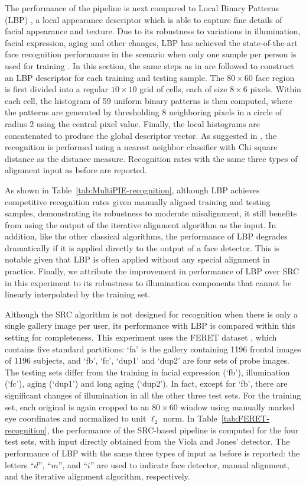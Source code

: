 The performance of the pipeline is next compared to Local Binary Patterns (LBP)
\cite{Ahonen2006-PAMI}, a local appearance descriptor which is able to capture
fine details of facial appearance and texture.  Due to its robustness to
variations in illumination, facial expression, aging and other changes, LBP has
achieved the state-of-the-art face recognition performance in the scenario when
only one sample per person is used for training \cite{Tan06facerecognition}. In
this section, the same steps as in \cite{Ahonen2006-PAMI} are followed to
construct an LBP descriptor for each training and testing sample. The $80\times
60$ face region is first divided into a regular $10\times 10$ grid of cells,
each of size $8\times 6$ pixels. Within each cell, the histogram of 59 uniform
binary patterns is then computed, where the patterns are generated by
thresholding 8 neighboring pixels in a circle of radius 2 using the central
pixel value. Finally, the local histograms are concatenated to produce the
global descriptor vector. As suggested in \cite{Ahonen2006-PAMI}, the
recognition is performed using a nearest neighbor classifier with Chi square
distance as the distance measure. Recognition rates with the
same three types of alignment input as before are reported.

As shown in Table~\ref{tab:MultiPIE-recognition}, although LBP
achieves competitive recognition rates given manually aligned
training and testing samples, demonstrating its robustness to
moderate misalignment, it still benefits from using the output
of the iterative alignment algorithm as the input. In addition,
like the other classical algorithms, the performance of LBP
degrades dramatically if it is applied directly to the output
of a face detector. This is notable given that LBP is often
applied without any special alignment in practice. Finally, we
attribute the improvement in performance of LBP over SRC in
this experiment to its robustness to illumination components
that cannot be linearly interpolated by the training set.

Although the SRC algorithm is not designed for recognition when there is only a
single gallery image per user, its performance with LBP is compared within this
setting for completeness. This experiment uses the FERET dataset
\cite{phillips1998feret}, which contains five standard partitions: `fa' is the
gallery containing 1196 frontal images of 1196 subjects, and `fb', `fc', `dup1'
and `dup2' are four sets of probe images. The testing sets differ from the
training in facial expression (`fb'), illumination (`fc'), aging (`dup1') and
long aging (`dup2'). In fact, except for `fb', there are significant changes of
illumination in all the other three test sets.  For the training set, each
original is again cropped to an $80\times 60$ window using manually marked eye
coordinates \cite{Deng2010-PR} and normalized to unit $\ell_2$ norm.  In
Table~\ref{tab:FERET-recognition}, the performance of the SRC-based pipeline is
computed for the four test sets, with input directly obtained from the Viola
and Jones' detector.  The performance of LBP with the same three types of input
as before is reported: the letters ``$d$'', ``$m$'', and ``$i$'' are used to
indicate face detector, manual alignment, and the iterative alignment
algorithm, respectively.

